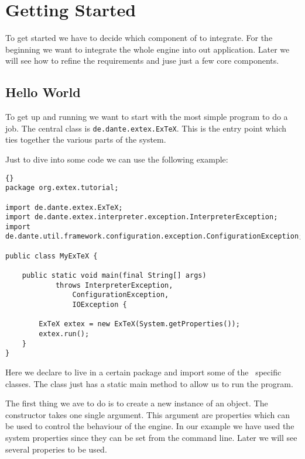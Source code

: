 

\chapter{Getting Started}

To get started we have to decide which component of \ExTeX{} to
integrate. For the beginning we want to integrate the whole engine
into out application. Later we will see how to refine the requirements
and juse just a few core components.


\section{Hello World}

To get up and running we want to start with the most simple program to
do a job. The central class is \texttt{de.dante.extex.ExTeX}. This is
the entry point which ties together the various parts of the system.

Just to dive into some code we can use the following example:

\begin{lstlisting}{}
package org.extex.tutorial;

import de.dante.extex.ExTeX;
import de.dante.extex.interpreter.exception.InterpreterException;
import de.dante.util.framework.configuration.exception.ConfigurationException;

public class MyExTeX {

    public static void main(final String[] args)
            throws InterpreterException,
                ConfigurationException,
                IOException {

        ExTeX extex = new ExTeX(System.getProperties());
        extex.run();
    }
}
\end{lstlisting}

Here we declare to live in a certain package and import some of the
\ExTeX\ specific classes. The class  just has a static
main method to allow us to run the program.

The first thing we ave to do is to create a new instance of an
 object. The constructor takes one single argument. This
argument are properties which can be used to control the behaviour of
the engine. In our example we have used the system properties since
they can be set from the command line. Later we will see several
properies to be used.


